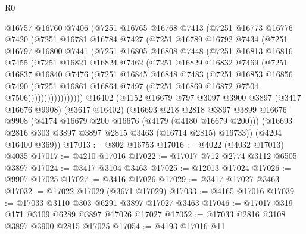 \begin{lexlean}{R0}
\begin{coremodule}
          @16757
          @16760
          @7406
          (@7251
            @16765
            @16768
            @7413
            (@7251
              @16773
              @16776
              @7420
              (@7251
                @16781
                @16784
                @7427
                (@7251
                  @16789
                  @16792
                  @7434
                  (@7251
                    @16797
                    @16800
                    @7441
                    (@7251
                      @16805
                      @16808
                      @7448
                      (@7251
                        @16813
                        @16816
                        @7455
                        (@7251
                          @16821
                          @16824
                          @7462
                          (@7251
                            @16829
                            @16832
                            @7469
                            (@7251
                              @16837
                              @16840
                              @7476
                              (@7251
                                @16845
                                @16848
                                @7483
                                (@7251
                                  @16853
                                  @16856
                                  @7490
                                  (@7251
                                    @16861
                                    @16864
                                    @7497
                                    (@7251 @16869 @16872 @7504 @7506)))))))))))))))))
    @16402
    (@4152
      @16679
      @797
      @3097
      @3900
      @3897
      (@3417 @16676 @9908)
      (@3617 @16402)
      (@16693
        @218
        @2818
        @3897
        @3899
        @16676
        @9908
        (@4174 @16679 @200 @16676 (@4179 (@4180 @16679 @200)))
        (@16693 @2816 @303 @3897 @3897 @2815 @3463 (@16714 @2815) @16733))
      (@4204 @16400 @369))
@17013 := @802 @16753
@17016 := @4022 (@4032 @17013) @4035
@17017 := @4210 @17016
@17022 := @17017 @712 @2774 @3112 @6505 @3897
@17024 := @3417 @3104 @3463
@17025 := @12013 @17024
@17026 := @9907 @17025
@17027 := @3416 @17026
@17029 := @3417 @17027 @3463
@17032 := @17022 @17029 (@3671 @17029)
@17033 := @4165 @17016
@17039 := @17033 @3110 @303 @6291 @3897 @17027 @3463
@17046 := @17017 @319 @171 @3109 @6289 @3897 @17026 @17027
@17052 := @17033 @2816 @3108 @3897 @3900 @2815 @17025
@17054 := @4193 @17016 @11

\end{coremodule}
\end{lexlean}
